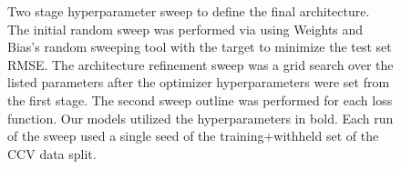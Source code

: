 \documentclass[journal=jmcmar,manuscript=article]{achemso}
\begin{document}
\begin{figure}[tb]
    
    \caption{Two stage hyperparameter sweep to define the final architecture. The initial random sweep was performed via using Weights and Bias's random sweeping tool with the target to minimize the test set RMSE. The architecture refinement sweep was a grid search over the listed parameters after the optimizer hyperparameters were set from the first stage. The second sweep outline was performed for each loss function. Our models utilized the hyperparameters in bold. Each run of the sweep used a single seed of the training+withheld set of the CCV data split.}
    \label{tab:wandsweep}
\end{figure}
\end{document}
